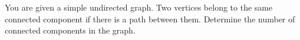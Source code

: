 You are given a simple undirected graph. Two vertices belong to the same connected component if there is a path between them. Determine the number of connected components in the graph.
